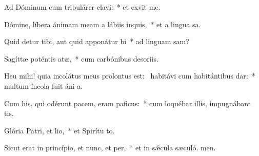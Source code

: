 \item Ad Dóminum cum tribulárer clavi:~* et exvit me.
\item Dómine, líbera ánimam meam a lábiis inquis,~* et a lingua sa.
\item Quid detur tibi, aut quid apponátur bi~* ad linguam sam?
\item Sagíttæ poténtis atæ,~* cum carbónibus desoriis.
\item Heu mihi! quia incolátus meus prolontus est:~\pscross{} habitávi cum habitántibus dar:~* multum íncola fuit áni a.
\item Cum his, qui odérunt pacem, eram paficus:~* cum loquébar illis, impugnábant  tis.
\item Glória Patri, et lio,~* et Spirítu to.
\item Sicut erat in princípio, et nunc, et per,~* et in sǽcula sæculó. men.
